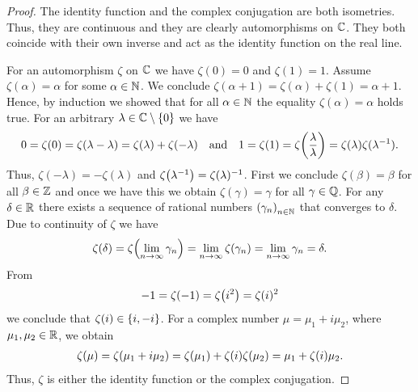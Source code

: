 \begin{proof}
	The identity function and the complex conjugation are both isometries. Thus, they are continuous and they are clearly automorphisms on $\mathbb{C}$. They both coincide with their own inverse and act as the identity function on the real line.
	
	For an automorphism $\zeta$ on $\mathbb{C}$ we have $\zeta(0) = 0$ and $\zeta(1) = 1$. Assume $\zeta(\alpha) = \alpha$ for some $\alpha \in \mathbb{N}$. We conclude $\zeta(\alpha + 1) = \zeta(\alpha) + \zeta(1) = \alpha + 1$. Hence, by induction we showed that for all $\alpha \in \mathbb{N}$ the equality $\zeta(\alpha) = \alpha$ holds true. For an arbitrary $\lambda \in \mathbb{C} \setminus \{0\}$ we have
	\begin{align*}
		0 = \zeta(0) = \zeta(\lambda - \lambda) = \zeta(\lambda) + \zeta(-\lambda) \quad \text{and} \quad 1 = \zeta(1) = \zeta{\left ( \frac{\lambda}{\lambda} \right )} = \zeta(\lambda) \zeta(\lambda^{-1}).
	\end{align*}
	Thus, $\zeta(- \lambda) = -\zeta(\lambda)$ and $\zeta{\left ( \lambda^{-1} \right )}= \zeta(\lambda)^{-1}$. First we conclude $\zeta(\beta) = \beta$ for all $\beta \in \mathbb{Z}$ and once we have this we obtain $\zeta(\gamma) = \gamma$ for all $\gamma \in \mathbb{Q}$. For any $\delta \in \mathbb{R}$ there exists a sequence of rational numbers ${\left ( \gamma_n \right )}_{n \in \mathbb{N}}$ that converges to $\delta$. Due to continuity of $\zeta$ we have 
	\begin{align*}
		\zeta(\delta) = \zeta{\left ( \lim_{n \to \infty} \gamma_n \right )} = \lim_{n \to \infty} \zeta(\gamma_n) = \lim_{n \to \infty} \gamma_n = \delta.
	\end{align*}
	From
	\begin{align*}
		-1 = \zeta(-1) = \zeta{\left ( i^2 \right )} = \zeta(i)^2
	\end{align*}
	we conclude that $\zeta(i) \in {\left \{ i, -i \right \}}$. For a complex number $\mu = \mu_1 + i \mu_2$, where $\mu_1, \mu_2 \in \mathbb{R}$, we obtain
	\begin{align*}
		\zeta(\mu) = \zeta{\left ( \mu_1 + i \mu_2 \right )} = \zeta{\left ( \mu_1 \right )} + \zeta(i) \zeta{\left ( \mu_2 \right )} = \mu_1 + \zeta(i) \mu_2.
	\end{align*}
	Thus, $\zeta$ is either the identity function or the complex conjugation.
\end{proof}


